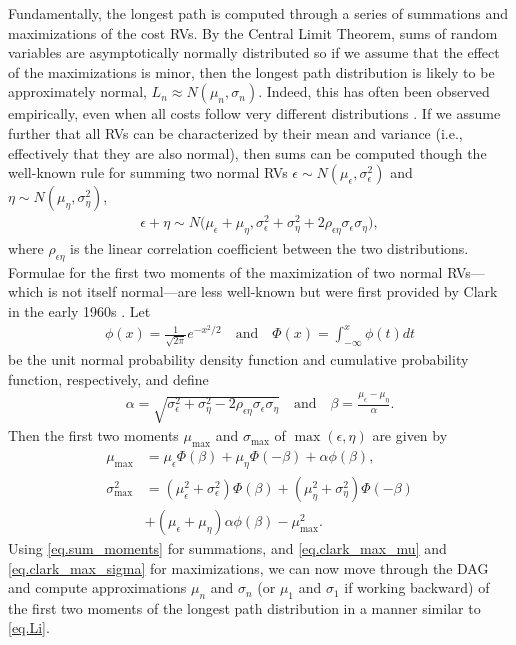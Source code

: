 \documentclass[12pt]{article}
\begin{document}
Fundamentally, the longest path is computed through a series of summations and maximizations of the cost RVs. By the Central Limit Theorem, sums of random variables are asymptotically normally distributed so if we assume that the effect of the maximizations is minor, then the longest path distribution is likely to be approximately normal, $L_n \approx N(\mu_n, \sigma_n)$. Indeed, this has often been observed empirically, even when all costs follow very different distributions \cite{can10}. If we assume further that all RVs can be characterized by their mean and variance (i.e., effectively that they are also normal), then sums can be computed though the well-known rule for summing two normal RVs $\epsilon \sim N(\mu_\epsilon, \sigma_\epsilon^2)$ and $\eta \sim N(\mu_\eta, \sigma_\eta^2)$,
\begin{align}
\label{eq.sum_moments}
\epsilon + \eta \sim N \big(\mu_\epsilon + \mu_\eta, \sigma_\epsilon^2 + \sigma_\eta^2 + 2 \rho_{\epsilon\eta}\sigma_\epsilon \sigma_\eta \big), 
\end{align}
where $\rho_{\epsilon\eta}$ is the linear correlation coefficient between the two distributions. Formulae for the first two moments of the maximization of two normal RVs---which is not itself normal---are less well-known but were first provided by Clark in the early 1960s \cite{cla61}. Let 
\begin{align*}
\phi(x) = \frac{1}{\sqrt{2\pi}} e^{-x^2/2} \quad \text{and} \quad \Phi(x) = \int_{-\infty}^{x} \phi(t) dt
\end{align*}
be the unit normal probability density function and cumulative probability function, respectively, and define 
\begin{align}
  \label{eq.alpha_beta}
\alpha = \sqrt{\sigma_\epsilon^2 + \sigma_\eta^2 - 2 \rho_{\epsilon\eta}\sigma_\epsilon \sigma_\eta} \quad \text{and} \quad \beta = \frac{\mu_\epsilon - \mu_\eta}{\alpha}. 
\end{align}
Then the first two moments $\mu_{\max}$ and $\sigma_{\max}$ of $\max(\epsilon, \eta)$ are given by
\begin{align}
\mu_{\max} &= \mu_\epsilon \Phi(\beta) + \mu_\eta \Phi(-\beta) + \alpha \phi(\beta), \label{eq.clark_max_mu}\\
\sigma_{\max}^2 &= (\mu_\epsilon^2 + \sigma_\epsilon^2) \Phi(\beta) + (\mu_\eta^2 + \sigma_\eta^2) \Phi(-\beta) \label{eq.clark_max_sigma}\\
&+ (\mu_\epsilon + \mu_\eta)\alpha\phi(\beta) -\mu_{\max}^2 \nonumber.
\end{align}
Using \eqref{eq.sum_moments} for summations, and \eqref{eq.clark_max_mu} and \eqref{eq.clark_max_sigma} for maximizations, we can now move through the DAG and compute approximations $\mu_n$ and $\sigma_n$ (or $\mu_1$ and $\sigma_1$ if working backward) of the first two moments of the longest path distribution in a manner similar to \eqref{eq.Li}.
\end{document}
